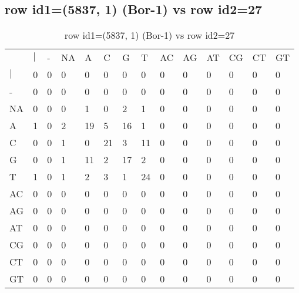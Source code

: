 \subsection{row id1=(5837, 1) (Bor-1) vs row id2=27}
\begin{center}
\begin{longtable}{|l|l|l|l|l|l|l|l|l|l|l|l|l|l|}
\caption{row id1=(5837, 1) (Bor-1) vs row id2=27} \label{table_dm2}\\
\hline
\\
\hline
&$|$&-&NA&A&C&G&T&AC&AG&AT&CG&CT&GT\\
$|$&0&0&0&0&0&0&0&0&0&0&0&0&0\\
-&0&0&0&0&0&0&0&0&0&0&0&0&0\\
NA&0&0&0&1&0&2&1&0&0&0&0&0&0\\
A&1&0&2&19&5&16&1&0&0&0&0&0&0\\
C&0&0&1&0&21&3&11&0&0&0&0&0&0\\
G&0&0&1&11&2&17&2&0&0&0&0&0&0\\
T&1&0&1&2&3&1&24&0&0&0&0&0&0\\
AC&0&0&0&0&0&0&0&0&0&0&0&0&0\\
AG&0&0&0&0&0&0&0&0&0&0&0&0&0\\
AT&0&0&0&0&0&0&0&0&0&0&0&0&0\\
CG&0&0&0&0&0&0&0&0&0&0&0&0&0\\
CT&0&0&0&0&0&0&0&0&0&0&0&0&0\\
GT&0&0&0&0&0&0&0&0&0&0&0&0&0\\
\hline
\end{longtable}
\end{center}

